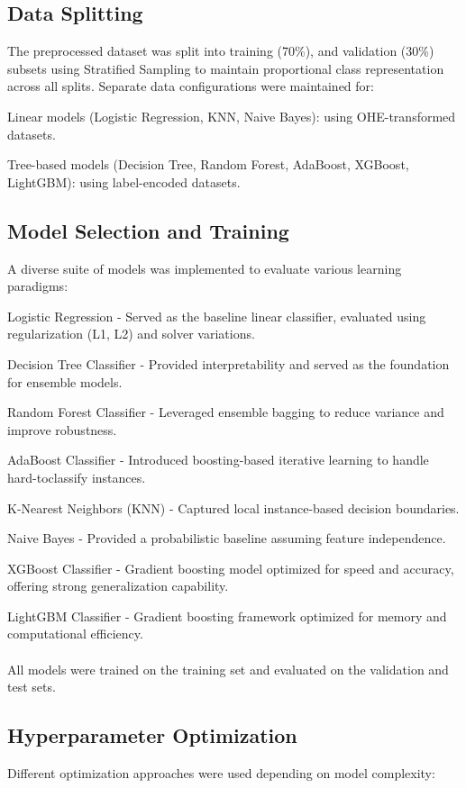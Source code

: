 \subsection{Data Splitting}\label{subsec:data-splitting}
The preprocessed dataset was split into training (70\%), and validation (30\%) subsets using Stratified Sampling to maintain proportional class representation across all splits.
Separate data configurations were maintained for:

Linear models (Logistic Regression, KNN, Naive Bayes): using OHE-transformed datasets.

Tree-based models (Decision Tree, Random Forest, AdaBoost, XGBoost, LightGBM): using label-encoded datasets.

\subsection{Model Selection and Training}\label{subsec:model-selection-and-training}
A diverse suite of models was implemented to evaluate various learning paradigms:

Logistic Regression - Served as the baseline linear classifier, evaluated using regularization (L1, L2) and solver variations.

Decision Tree Classifier - Provided interpretability and served as the foundation for ensemble models.

Random Forest Classifier - Leveraged ensemble bagging to reduce variance and improve robustness.

AdaBoost Classifier - Introduced boosting-based iterative learning to handle hard-toclassify instances.

K-Nearest Neighbors (KNN) - Captured local instance-based decision boundaries.

Naive Bayes - Provided a probabilistic baseline assuming feature independence.

XGBoost Classifier - Gradient boosting model optimized for speed and accuracy, offering strong generalization capability.

LightGBM Classifier - Gradient boosting framework optimized for memory and computational efficiency.
\\ \\
All models were trained on the training set and evaluated on the validation and test sets.

\subsection{Hyperparameter Optimization}\label{subsec:hyperparameter-optimization}
Different optimization approaches were used depending on model complexity:


